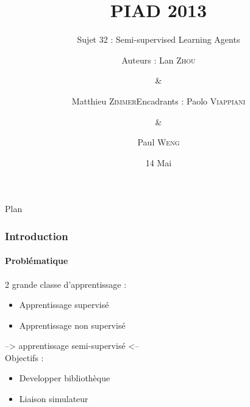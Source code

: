 \documentclass[11pt, handout]{beamer}
\title{ \textbf{PIAD 2013}}
\subtitle[\ldots]{Sujet 32 : Semi-supervised Learning Agents%
}
\author{Auteurs : Lan \textsc{Zhou} \and \& \and Matthieu \textsc{Zimmer}\newline Encadrants : Paolo \textsc{Viappiani} \and \& \and Paul \textsc{Weng}}
\institute{Université Pierre et Marie Curie}
\date{14 Mai}
\begin{document}

\begin{frame}
\maketitle
\end{frame}



\usebackgroundtemplate{}
\begin{frame}

\begin{center}{\Large Plan }\end{center}
  \tableofcontents
\end{frame}

% 
% 


\begin{frame}
 \frametitle{Introduction}
 \framesubtitle{Problématique}
 2 grande classe d'apprentissage :
 \begin{itemize}
  \item Apprentissage supervisé
  \item Apprentissage non supervisé
 \end{itemize}
 --> apprentissage semi-supervisé <--\\[1cm]
 
 Objectifs :
 \begin{itemize}
  \item Developper bibliothèque
  \item Liaison simulateur
 \end{itemize}

 
 
\end{frame}
\usebackgroundtemplate{}
\end{document}
